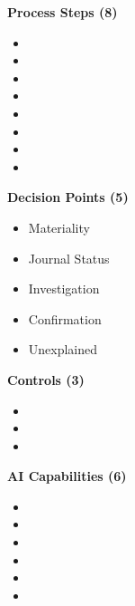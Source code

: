 \begin{tcolorbox}[colback=white,colframe=sapblue,title=\textbf{TB-HITL Quick Reference Card --- Print \& Keep}]
\begin{minipage}[t]{0.32\textwidth}
\textbf{Process Steps (8)}
\begin{itemize}[noitemsep,leftmargin=*,font=\small]
  \item {}
  \item {}
  \item {}
  \item {}
  \item {}
  \item {}
  \item {}
  \item {}
\end{itemize}
\end{minipage}%
\begin{minipage}[t]{0.32\textwidth}
\textbf{Decision Points (5)}
\begin{itemize}[noitemsep,leftmargin=*,font=\small]
  \item {} Materiality
  \item {} Journal Status
  \item {} Investigation
  \item {} Confirmation
  \item {} Unexplained
\end{itemize}

\textbf{Controls (3)}
\begin{itemize}[noitemsep,leftmargin=*,font=\small]
  \item {}
  \item {}
  \item {}
\end{itemize}
\end{minipage}%
\begin{minipage}[t]{0.32\textwidth}
\textbf{AI Capabilities (6)}
\begin{itemize}[noitemsep,leftmargin=*,font=\small]
  \item {}
  \item {}
  \item {}
  \item {}
  \item {}
  \item {}
\end{itemize}
\end{minipage}


\end{tcolorbox}
